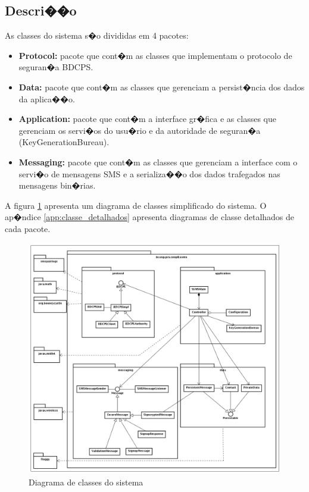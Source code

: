 \documentclass[a4paper,capchap,espacoduplo,normaltoc]{abntepusp}
\begin{document}
\subsection{Descri��o}
As classes do sistema s�o divididas em 4 pacotes: 
\begin{itemize}
\item \textbf{Protocol:} pacote que cont�m as classes que implementam o protocolo de seguran�a BDCPS.
\item \textbf{Data:} pacote que cont�m as classes que gerenciam a persist�ncia dos dados da aplica��o.
\item \textbf{Application:} pacote que cont�m a interface gr�fica e as classes que gerenciam os servi�os do usu�rio e da autoridade de seguran�a (KeyGenerationBureau).
\item \textbf{Messaging:} pacote que cont�m as classes que gerenciam a interface com o servi�o de mensagens SMS e a serializa��o dos dados trafegados nas mensagens bin�rias.
\end{itemize}
A figura \ref{fig:class_diagram} apresenta um diagrama de classes simplificado do sistema. O ap�ndice \ref{app:classe_detalhados} apresenta diagramas de classe detalhados de cada pacote.
\begin{figure}[h]
	\centering		\includegraphics[width=1.00\textwidth]{figuras/class_diagram.PNG}
	\caption{Diagrama de classes do sistema}
	\label{fig:class_diagram}
\end{figure}
\end{document}
